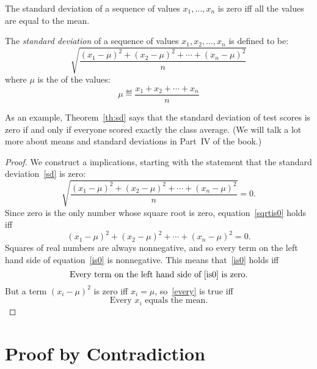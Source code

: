 \begin{theorem}\label{th:sd}
The standard deviation of a sequence of values $x_1, \dots, x_n$ is
zero iff all the values are equal to the mean.
\end{theorem}

\begin{definition*}
The \emph{standard deviation} of a sequence of values $x_1, x_2,
\dots, x_n$ is defined to be:
%
\begin{equation}\label{sd}
\sqrt{\frac{(x_1 - \mu)^2 + (x_2 - \mu)^2 + \cdots + (x_n - \mu)^2}{n}}
\end{equation}
%
where $\mu$ is the  of the values:
%
\[
\mu \eqdef \frac{x_1 + x_2 + \cdots + x_n}{n}
\]
\end{definition*}

As an example, Theorem~\ref{th:sd} says that the standard deviation of
test scores is zero if and only if everyone scored exactly the class
average.  (We will talk a lot more about means and standard deviations
in Part~IV of the book.)

\begin{proof}
We construct a  implications, starting with the
statement that the standard deviation~\eqref{sd} is zero:
%
\begin{equation}\label{sqrtis0}
\sqrt{\frac{(x_1 - \mu)^2 + (x_2 - \mu)^2 + \cdots + (x_n - \mu)^2}{n}} = 0.
\end{equation}
%
Since zero is the only number whose square root is zero,
equation~\eqref{sqrtis0} holds iff
\begin{equation}\label{is0}
(x_1 - \mu)^2 + (x_2 - \mu)^2 + \cdots + (x_n - \mu)^2 = 0.
\end{equation}
Squares of real numbers are always nonnegative, and so every term on the
left hand side of equation~\eqref{is0} is nonnegative.  This means
that~\eqref{is0} holds iff
\begin{equation}\label{every}
\text{Every term on the left hand side of~\eqref{is0} is zero.}
\end{equation}
But a term $(x_i - \mu)^2$ is zero iff $x_i=\mu$, so~\eqref{every} is true
iff
\[
\text{Every $x_i$ equals the mean.}
\]

\end{proof}


\section{Proof by Contradiction}\label{contradiction}

